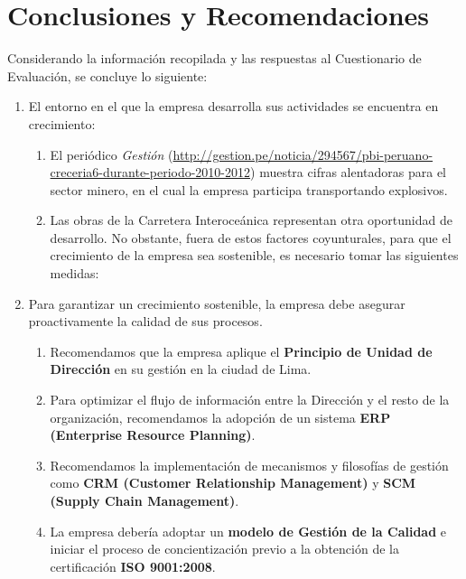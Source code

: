 \documentclass[a4paber,12pt]{article}
\begin{document}
	\section*{Conclusiones y Recomendaciones}
	
	Considerando la información recopilada y las respuestas al Cuestionario de Evaluación, se concluye lo siguiente:
	
	\begin{enumerate}
		\item El entorno en el que la empresa desarrolla sus actividades se encuentra en crecimiento:
		\begin{enumerate}
			\item El periódico \emph{Gestión} (\url{http://gestion.pe/noticia/294567/pbi-peruano-creceria6-durante-periodo-2010-2012}) muestra cifras alentadoras para el sector minero, en el cual la empresa participa transportando explosivos.
			
			\item Las obras de la Carretera Interoceánica representan otra oportunidad de desarrollo. No obstante, fuera de estos factores coyunturales, para que el crecimiento de la empresa sea sostenible, es necesario tomar las siguientes medidas:
		\end{enumerate}
		
		\item Para garantizar un crecimiento sostenible, la empresa debe asegurar proactivamente la calidad de sus procesos.
		\begin{enumerate}
			\item Recomendamos que la empresa aplique el \textbf{Principio de Unidad de Dirección} en su gestión en la ciudad de Lima.
			
			\item Para optimizar el flujo de información entre la Dirección y el resto de la organización, recomendamos la adopción de un sistema \textbf{ERP (Enterprise Resource Planning)}.
			
			\item Recomendamos la implementación de mecanismos y filosofías de gestión como \textbf{CRM (Customer Relationship Management)} y \textbf{SCM (Supply Chain Management)}.
			
			\item La empresa debería adoptar un \textbf{modelo de Gestión de la Calidad} e iniciar el proceso de concientización previo a la obtención de la certificación \textbf{ISO 9001:2008}.
		\end{enumerate}
		

\end{enumerate}
\end{document}

